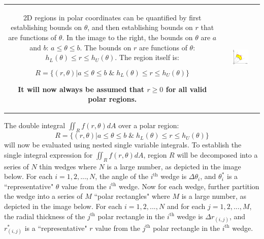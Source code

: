 \documentclass{article}
\begin{document}
\begin{tabular}{cc}
\parbox{0.5\textwidth}{
2D regions in polar coordinates can be quantified by first establishing bounds on \(\theta\), and then establishing bounds on \(r\) that are functions of \(\theta\). In the image to the right, the bounds on \(\theta\) are \(a\) and \(b\): \(a \leq \theta \leq b\). The bounds on \(r\) are functions of \(\theta\): \(h_L(\theta) \leq r \leq h_U(\theta)\). The region itself is:

\[R = \{(r, \theta) | a \leq \theta \leq b \;\&\; h_L(\theta) \leq r \leq h_U(\theta)\}\]

{\bf It will now always be assumed that \(r \geq 0\) for all valid polar regions.}

} & \parbox{0.5\textwidth}{
\includegraphics[width = 0.5\textwidth]{general_Polar_region}
}
\end{tabular}

The double integral \(\iint_R f(r,\theta)dA\) over a polar region: 
\[R = \{(r, \theta) | a \leq \theta \leq b \;\&\; h_L(\theta) \leq r \leq h_U(\theta)\}\]
will now be evaluated using nested single variable integrals. To establish the single integral expression for \(\iint_R f(r,\theta)dA\), region \(R\) will be decomposed into a series of \(N\) thin wedges where \(N\) is a large number, as depicted in the image below. For each \(i = 1, 2, ..., N\), the angle of the \(i^{\text{th}}\) wedge is \(\Delta \theta_i\), and \(\theta_i^*\) is a ``representative" \(\theta\) value from the \(i^{\text{th}}\) wedge. Now for each wedge, further partition the wedge into a series of \(M\) ``polar rectangles" where \(M\) is a large number, as depicted in the image below. For each \(i = 1, 2, ..., N\) and for each \(j = 1, 2, ..., M\), the radial thickness of the \(j^{\text{th}}\) polar rectangle in the \(i^{\text{th}}\) wedge is \(\Delta r_{(i,j)}\), and \(r_{(i,j)}^*\) is a ``representative" \(r\) value from the \(j^{\text{th}}\) polar rectangle in the \(i^{\text{th}}\) wedge. 
\end{document}
